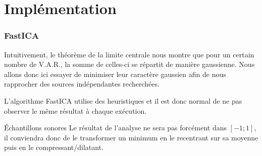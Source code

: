 \documentclass[compress]{beamer}
\begin{document}
\section{Implémentation}
\begin{frame}
	\frametitle{FastICA}
	Intuitivement, le théorème de la limite centrale nous montre que pour un
	certain nombre de V.A.R., la somme de celles-ci se répartit de manière
	gaussienne. Nous allons donc ici essayer de minimiser leur caractère
	gaussien afin de nous rapprocher des sources indépendantes recherchées.
	\pause
	\vfill

	L'algorithme FastICA utilise des heuristiques et il est donc normal
	de ne pas observer le même résultat à chaque exécution.
	\pause
	\vfill

	\begin{block}{Échantillons sonores}
	Le résultat de l'analyse ne sera pas forcément dans $[-1;1]$,
	il conviendra donc de le transformer un minimum en le recentrant
	sur sa moyenne puis en le compressant/dilatant.
	\end{block}

\end{frame}
\end{document}
